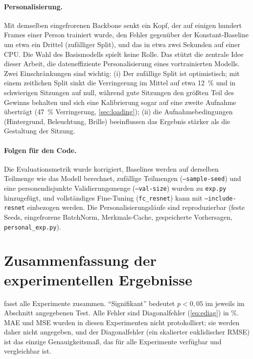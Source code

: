 \documentclass[
  11pt,
  a4paper,
  oneside,
  DIV=12,
  BCOR=8mm,
  parskip=half,
  headings=normal,
  bibliography=totoc,
  listof=totoc
]{scrreprt}
\newcommand{\code}[1]{\texttt{#1}}
\begin{document}
\paragraph{Personalisierung.}
Mit demselben eingefrorenen Backbone senkt ein Kopf, der auf einigen hundert
Frames einer Person trainiert wurde, den Fehler gegenüber der
Konstant-Baseline um etwa ein Drittel (zufälliger Split), und das in etwa
zwei Sekunden auf einer CPU. Die Wahl des Basismodells spielt keine Rolle.
Das stützt die zentrale Idee dieser Arbeit, die dateneffiziente
Personalisierung eines vortrainierten Modells. Zwei Einschränkungen sind
wichtig: (i) Der zufällige Split ist optimistisch; mit einem zeitlichen Split
sinkt die Verringerung im Mittel auf etwa \SI{12}{\percent} und in schwierigen
Sitzungen auf null, während gute Sitzungen den größten Teil des Gewinns
behalten und sich eine Kalibrierung sogar auf eine zweite Aufnahme überträgt
(\SI{47}{\percent} Verringerung, \cref{sec:loading}); (ii) die
Aufnahmebedingungen (Hintergrund, Beleuchtung, Brille) beeinflussen das
Ergebnis stärker als die Gestaltung der Sitzung.

\paragraph{Folgen für den Code.} Die Evaluationsmetrik wurde korrigiert,
Baselines werden auf derselben Teilmenge wie das Modell berechnet, zufällige
Teilmengen (\code{--sample-seed}) und eine personendisjunkte
Validierungsmenge (\code{--val-size}) wurden zu \code{exp.py} hinzugefügt, und
vollständiges Fine-Tuning (\code{fc\_resnet}) kann mit \code{--include-resnet}
einbezogen werden. Die Personalisierungsläufe sind reproduzierbar (feste
Seeds, eingefrorene BatchNorm, Merkmals-Cache, gespeicherte Vorhersagen,
\code{personal\_exp.py}).

\section{Zusammenfassung der experimentellen Ergebnisse}
\label{sec:summary}

 fasst alle Experimente zusammen. \enquote{Signifikant}
bedeutet $p<0,05$ im jeweils im Abschnitt angegebenen Test. Alle Fehler sind
Diagonalfehler (\cref{eq:ediag}) in \si{\percent}. MAE und MSE wurden in
diesen Experimenten nicht protokolliert; sie werden daher nicht angegeben,
und der Diagonalfehler (ein skalierter euklidischer RMSE) ist das einzige
Genauigkeitsmaß, das für alle Experimente verfügbar und vergleichbar ist.
\end{document}
